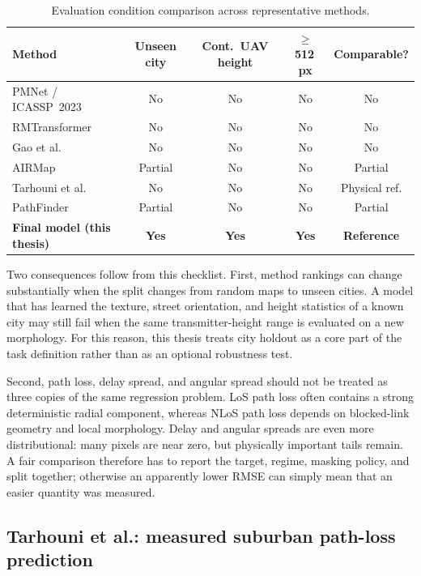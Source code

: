 \begin{table}[ht]
\centering
\caption{Evaluation condition comparison across representative methods.}
\label{tab:fairness}
\small
\begin{tabularx}{\textwidth}{Xcccc}
\toprule
\textbf{Method} & \textbf{Unseen city} & \textbf{Cont.\ UAV height}
  & \textbf{$\ge$512\,px} & \textbf{Comparable?} \\
\midrule
PMNet / ICASSP~2023 \cite{pmnet2023} & No & No & No & No \\
RMTransformer \cite{rmtransformer2025} & No & No & No & No \\
Gao et al.\ \cite{gao2026} & No & No & No & No \\
AIRMap \cite{airmap2025} & Partial & No & No & Partial \\
Tarhouni et al.\ \cite{tarhouni2025} & No & No & No & Physical ref. \\
PathFinder \cite{pathfinder2025} & Partial & No & No & Partial \\
\textbf{Final model (this thesis)} & \textbf{Yes} & \textbf{Yes} & \textbf{Yes}
  & \textbf{Reference} \\
\bottomrule
\end{tabularx}
\end{table}

Two consequences follow from this checklist. First, method rankings can change
substantially when the split changes from random maps to unseen cities. A model
that has learned the texture, street orientation, and height statistics of a
known city may still fail when the same transmitter-height range is evaluated
on a new morphology. For this reason, this thesis treats city holdout as a
core part of the task definition rather than as an optional robustness test.

Second, path loss, delay spread, and angular spread should not be treated as
three copies of the same regression problem. LoS path loss often contains a
strong deterministic radial component, whereas NLoS path loss depends on
blocked-link geometry and local morphology. Delay and angular spreads are even
more distributional: many pixels are near zero, but physically important tails
remain. A fair comparison therefore has to report the target, regime, masking
policy, and split together; otherwise an apparently lower RMSE can simply mean
that an easier quantity was measured.

\subsection{Tarhouni et al.: measured suburban path-loss prediction}

